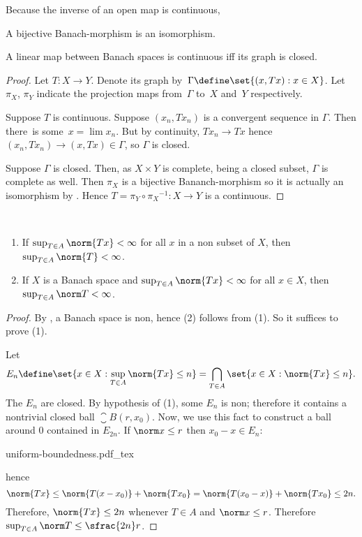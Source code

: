 \documentclass{scrartcl}
\newcommand{\ball}{B}
\begin{document}
Because the inverse of an open map is continuous,
\begin{cor}\label{bounded inverse}
  A bijective Banach-morphism is an isomorphism.
\end{cor}
\begin{theorem}
  A linear map between Banach spaces is continuous iff its graph is closed.
\end{theorem}
\begin{proof}
  \newcommand{\graph}{\Gamma}
  Let \(T:X \to Y\). Denote its graph by~\(\graph\define\set{(x,Tx):x\in X}\).
  Let~\(\pi_X\), \(\pi_Y\) indicate the projection maps from~\(\graph\) to~\(X\) and~\(Y\) respectively.

  Suppose \(T\) is continuous. Suppose \((x_n,Tx_n)\) is a convergent sequence in \(\graph\). Then there~is some~\(x=\lim x_n\). But by continuity, \(Tx_n\to Tx\) hence \((x_n,Tx_n)\to (x,Tx)\in\graph\), so \(\graph\) is closed.

  Suppose \(\graph\) is closed. Then, as \(X\times Y\) is complete, being a closed subset, \(\graph\) is complete as well.
  Then \(\pi_X\) is a bijective Bananch-morphism so it is actually an isomorphism by . Hence
  \(T=\pi_Y\circ {\pi_X}^{-1}: X\to Y\) is a continuous.
\end{proof}
\begin{theorem}\label{uniform bdd} \
  \begin{enumerate}
  \item If\/ \(\sup_{T\in A} \norm{Tx} < \infty\) for all \(x\) in a non
    subset of \(X\), then\/ \(\sup_{T\in A}\norm{T}<\infty\).
  \item If \(X\) is a Banach space and\/ \(\sup_{T\in A}\norm{Tx}< \infty\) for all \(x\in X\), then\/ \(\sup_{T\in A}\norm T < \infty\).
  \end{enumerate}
\end{theorem}
\begin{proof}
  By , a Banach space is non, hence (2) follows from (1). So it suffices to prove (1).

  Let
  \[
    E_n\define \set{x\in X : \sup_{T\in A}\norm{Tx} \leq n} = \bigcap_{T\in A} \set{x\in X: \norm{Tx} \leq n}.
  \]
  The \(E_n\) are closed. By hypothesis of (1), some \(E_n\) is non; therefore it contains a nontrivial closed ball \(\closure{\ball(r,x_0)}\). Now, we use this fact to construct a ball around \(0\) contained in \(E_{2n}\). If \(\norm x \leq r\) then \(x_0-x\in E_n\):
  \begin{center}
    {uniform-boundedness.pdf_tex}
  \end{center}
  hence
  \[
    \norm{Tx} \leq \norm{T(x-x_0)}+\norm{Tx_0} = \norm{T(x_0-x)}+\norm{Tx_0} \leq 2n.
  \]
  Therefore, \(\norm{Tx}\leq 2n\) whenever \(T\in A\) and \(\norm x \leq r\). Therefore \(\sup_{T\in A}\norm T \leq \sfrac {2n} r\).
\end{proof}
\printbibliography
\end{document}
